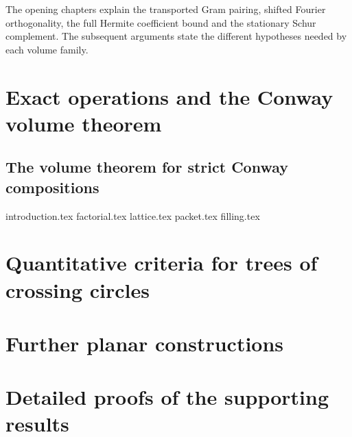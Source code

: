 \documentclass[11pt,oneside]{book}
\numberwithin{equation}{chapter}
\theoremstyle{definition}\newtheorem{definition}[theorem]{Definition}
\theoremstyle{remark}\newtheorem{remark}[theorem]{Remark}
\begin{document}
The opening chapters explain the transported Gram pairing, shifted
Fourier orthogonality, the full Hermite coefficient bound and the
stationary Schur complement. The subsequent arguments state the
different hypotheses needed by each volume family.

\tableofcontents
\mainmatter
\part{Exact operations and the Conway volume theorem}


\chapter{The volume theorem for strict Conway compositions}
\label{ch:conway-current}
{introduction.tex}
{factorial.tex}
{lattice.tex}
{packet.tex}
{filling.tex}
\part{Quantitative criteria for trees of crossing circles}



\part{Further planar constructions}


\part{Detailed proofs of the supporting results}
\appendix













\backmatter


\end{document}
